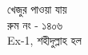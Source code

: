 \documentclass{article}
\begin{document}
\centering
{}
{{\fontsize{110}{132} \selectfont খেজুর পাওয়া যায়\\}{\fontsize{90}{108}\selectfont রুম নং - ১৪০৬\\ Ex-1, শহীদুল্লাহ হল\\}\vspace{2.5cm}}
\end{document}
